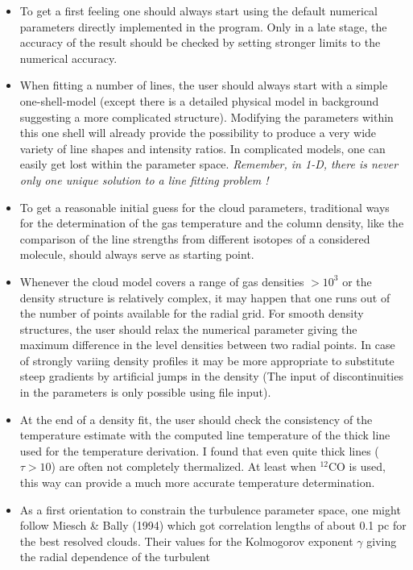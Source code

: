 \begin{itemize}
\item{}To get a first feeling one should always start using the
default numerical parameters directly implemented in the program.
Only in a late stage, the accuracy of the result should be checked
by setting stronger limits to the numerical accuracy.
\item{}When fitting a number of lines, the user should always start
with a simple one-shell-model (except there is a detailed physical model
in background suggesting a more complicated structure). Modifying
the parameters within this one shell will already provide the possibility
to produce a very wide variety of line shapes and intensity ratios.
In complicated models, one can easily get lost within the
parameter space. {\it Remember, in 1-D, there is never only one unique
solution to a line fitting problem !}
\item{}To get a reasonable initial guess for the  cloud parameters,
traditional ways for the determination of the gas temperature and the
column density, like the comparison of the line strengths from different
isotopes of a considered molecule, should always serve as starting point.
\item{}Whenever the cloud model covers a range of gas densities $>10^3$
or the density structure is relatively complex, it may happen
that one runs out of the number of points available for the radial grid. 
For smooth density structures, the user should relax the numerical 
parameter giving the maximum difference in the level densities between 
two radial points. In case of strongly variing density profiles it 
may be more appropriate to substitute steep gradients by artificial 
jumps in the density (The input of discontinuities in the parameters 
is only possible using file input).
\item{}At the end of a density fit, the user should check the
consistency of the temperature estimate with the computed line temperature
of the thick line used for the temperature derivation. I found that
even quite thick lines ($\tau > 10$) are often not completely 
thermalized. At least when ${}^{12}$CO is used, this way can provide a much 
more accurate temperature determination.
\item{} As a first orientation to constrain the turbulence parameter
space, one might follow Miesch \& Bally (1994) which got correlation lengths
of about 0.1 pc for the best resolved clouds. Their values for the Kolmogorov
exponent $\gamma$ giving the radial dependence of the turbulent

\end{itemize}
